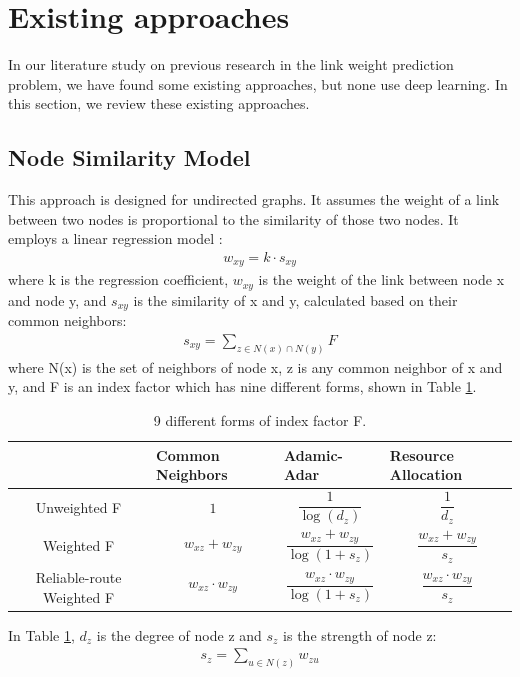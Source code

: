 \documentclass[book,12pt]{WSUThesis}
\theoremstyle{definition}
\begin{document}
\section{Existing approaches}
In our literature study on previous research in the link weight prediction problem,
we have found some existing approaches, but none use deep learning.
In this section,
we review these existing approaches.

\subsection{Node Similarity Model}
This approach is designed for undirected graphs.
It assumes the weight of a link between two nodes 
is proportional to the similarity of those two nodes.
It employs a linear regression model \cite{zhao2015prediction}:
\begin{align*}
w_{xy} = k \cdot s_{xy}
\end{align*}
where k is the regression coefficient,
$ w_{xy} $ is the weight of the link between node x and node y,
and $ s_{xy} $ is the similarity of x and y, calculated based on their common neighbors:
\begin{align*}
s_{xy} = \sum_{z \in N(x) \cap N(y)} F
\end{align*}
where N(x) is the set of neighbors of node x, z is any common neighbor of x and y,
and F is an index factor which has nine different forms, shown in Table \ref{tab:indexes}.
\begin{table}[!ht]\centering
	\caption{9 different forms of index factor F.}
	\begin{tabularx}{\textwidth}{>{\columncolor{blue!30}}cXXX}  \hline \rowcolor{blue!30}
		& Common Neighbors & Adamic-Adar & Resource Allocation \\ \hline
		Unweighted F &
		\[1\] &
		\[\frac{1}{\log(d_z)}\] &
		\[\frac{1}{d_z}\] \\ \hline
		Weighted F &
		\[w_{xz} + w_{zy}\] &
		\[\frac{w_{xz} + w_{zy}}{\log(1 + s_z)}\] &
		\[\frac{w_{xz} + w_{zy}}{s_z}\] \\ \hline
		Reliable-route Weighted F &
		\[ w_{xz} \cdot w_{zy}\] &
		\[\frac{w_{xz} \cdot w_{zy}}{\log(1 + s_z)}\] &
		\[\frac{w_{xz} \cdot w_{zy}}{s_z}\] \\ \hline
	\end{tabularx}
	\label{tab:indexes}
\end{table}
In Table \ref{tab:indexes}, $ d_z $ is the degree of node z and $ s_z $ is the strength of node z:
\begin{align*}
s_z = \sum_{u \in N(z)} w_{zu}
\end{align*}
\end{document}
